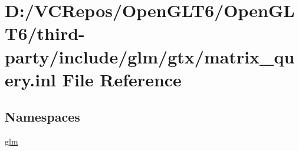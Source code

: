 \hypertarget{matrix__query_8inl}{}\section{D\+:/\+V\+C\+Repos/\+Open\+G\+L\+T6/\+Open\+G\+L\+T6/third-\/party/include/glm/gtx/matrix\+\_\+query.inl File Reference}
\label{matrix__query_8inl}
\subsection*{Namespaces}
\begin{DoxyCompactItemize}
\item 
 \mbox{\hyperlink{namespaceglm}{glm}}
\end{DoxyCompactItemize}
